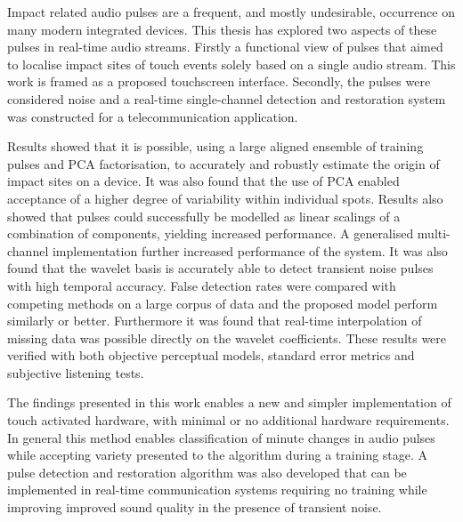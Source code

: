 

\begin{thesissummary}
Impact related audio pulses are a frequent, and mostly undesirable, occurrence on many modern integrated devices. This thesis has explored two aspects of these pulses in real-time audio streams. Firstly a functional view of pulses that aimed to localise impact sites of touch events solely based on a single audio stream. This work is framed as a proposed touchscreen interface. Secondly, the pulses were considered noise and a real-time single-channel detection and restoration system was constructed for a telecommunication application.

Results showed that it is possible, using a large aligned ensemble of training pulses and PCA factorisation, to accurately and robustly estimate the origin of impact sites on a device. It was also found that the use of PCA enabled acceptance of a higher degree of variability within individual spots. Results also showed that pulses could successfully be modelled as linear scalings of a combination of components, yielding increased performance. A generalised multi-channel implementation further increased performance of the system. It was also found that the wavelet basis is accurately able to detect transient noise pulses with high temporal accuracy. False detection rates were compared with competing methods on a large corpus of data and the proposed model perform similarly or better. Furthermore it was found that real-time interpolation of missing data was possible directly on the wavelet coefficients. These results were verified with both objective perceptual models, standard error metrics and subjective listening tests.

The findings presented in this work enables a new and simpler implementation of touch activated hardware, with minimal or no additional hardware requirements. In general this method enables classification of minute changes in audio pulses while accepting variety presented to the algorithm during a training stage. A pulse detection and restoration algorithm was also developed that can be implemented in real-time communication systems requiring no training while improving improved sound quality in the presence of transient noise.

\end{thesissummary}





